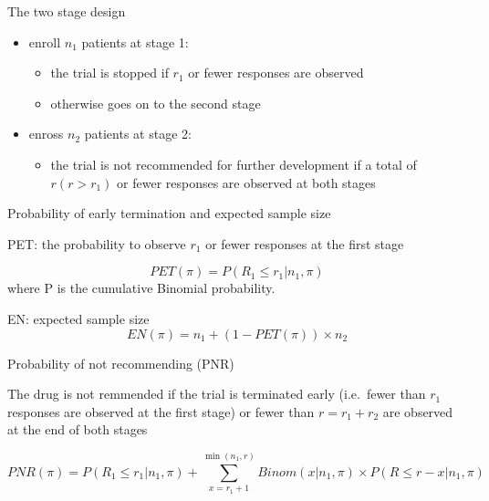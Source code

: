 \documentclass{beamer}
\begin{document}
\begin{frame}{The two stage design}

\begin{itemize}
\itemsep1pt\parskip0pt
\item
  enroll \(n_1\) patients at stage 1:

  \begin{itemize}
  \itemsep1pt\parskip0pt
  \item
    the trial is stopped if \(r_1\) or fewer responses are observed
  \item
    otherwise goes on to the second stage
  \end{itemize}
\item
  enross \(n_2\) patients at stage 2:

  \begin{itemize}
  \itemsep1pt\parskip0pt
  \item
    the trial is not recommended for further development if a total of
    \(r (r > r_1)\) or fewer responses are observed at both stages
  \end{itemize}
\end{itemize}

\end{frame}

\begin{frame}{Probability of early termination and expected sample size}

PET: the probability to observe \(r_1\) or fewer responses at the first
stage

\[
PET(\pi) = P(R_1\leq r_1\vert n_1, \pi)
\] where P is the cumulative Binomial probability.

EN: expected sample size \[
EN(\pi)= n_1 + (1-PET(\pi))\times n_2
\]

\end{frame}



\begin{frame}{Probability of not recommending (PNR)}

The drug is not remmended if the trial is terminated early (i.e.~fewer
than \(r_1\) responses are observed at the first stage) or fewer than
\(r = r_1 + r_2\) are observed at the end of both stages

\[
PNR(\pi) = P(R_1\leq r_1\vert n_1, \pi) + \sum_{x=r_1+1}^{\min(n_1,r)} Binom(x\vert n_1,\pi)\times P(R\leq r-x\vert n_1, \pi)
\]

\end{frame}
\end{document}
